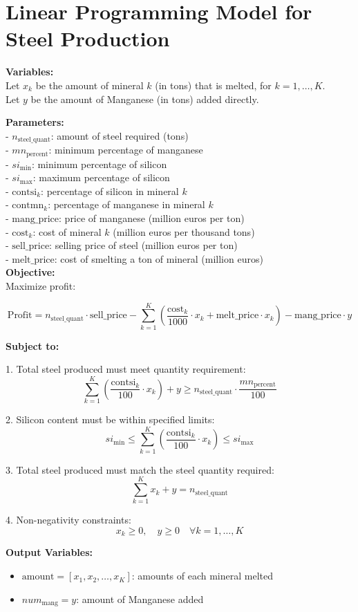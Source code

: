 \documentclass{article}
\begin{document}
\section*{Linear Programming Model for Steel Production}

\textbf{Variables:} \\
Let \( x_k \) be the amount of mineral \( k \) (in tons) that is melted, for \( k = 1, \ldots, K \). \\
Let \( y \) be the amount of Manganese (in tons) added directly.

\textbf{Parameters:} \\
- \( n_{\text{steel\_quant}} \): amount of steel required (tons) \\
- \( mn_{\text{percent}} \): minimum percentage of manganese \\
- \( si_{\text{min}} \): minimum percentage of silicon \\
- \( si_{\text{max}} \): maximum percentage of silicon \\
- \( \text{contsi}_k \): percentage of silicon in mineral \( k \) \\
- \( \text{contmn}_k \): percentage of manganese in mineral \( k \) \\
- \( \text{mang\_price} \): price of manganese (million euros per ton) \\
- \( \text{cost}_k \): cost of mineral \( k \) (million euros per thousand tons) \\
- \( \text{sell\_price} \): selling price of steel (million euros per ton) \\
- \( \text{melt\_price} \): cost of smelting a ton of mineral (million euros) \\

\textbf{Objective:} \\
Maximize profit:

\[
\text{Profit} = n_{\text{steel\_quant}} \cdot \text{sell\_price} - \sum_{k=1}^{K} \left( \frac{\text{cost}_k}{1000} \cdot x_k + \text{melt\_price} \cdot x_k \right) - \text{mang\_price} \cdot y
\]

\textbf{Subject to:}

1. Total steel produced must meet quantity requirement:
\[
\sum_{k=1}^{K} \left( \frac{\text{contsi}_k}{100} \cdot x_k \right) + y \geq n_{\text{steel\_quant}} \cdot \frac{mn_{\text{percent}}}{100}
\]

2. Silicon content must be within specified limits:
\[
si_{\text{min}} \leq \sum_{k=1}^{K} \left( \frac{\text{contsi}_k}{100} \cdot x_k \right) \leq si_{\text{max}}
\]

3. Total steel produced must match the steel quantity required:
\[
\sum_{k=1}^{K} x_k + y = n_{\text{steel\_quant}}
\]

4. Non-negativity constraints:
\[
x_k \geq 0, \quad y \geq 0 \quad \forall k = 1, \ldots, K
\]

\textbf{Output Variables:}
\begin{itemize}
    \item \( \text{amount} = [x_1, x_2, \ldots, x_K] \): amounts of each mineral melted
    \item \( num_{\text{mang}} = y \): amount of Manganese added
\end{itemize}
\end{document}
